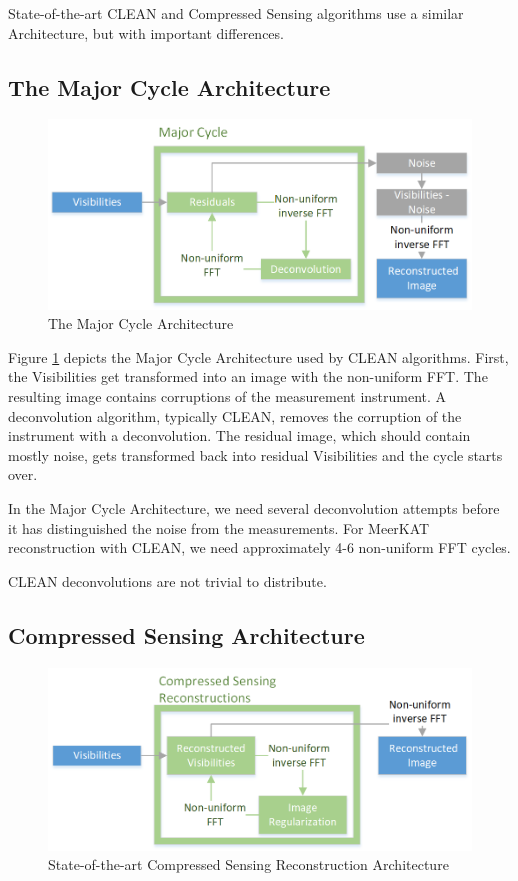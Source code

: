 State-of-the-art CLEAN and Compressed Sensing algorithms use a similar Architecture, but with important differences.


\subsection{The Major Cycle Architecture}

\begin{figure}[h]
	\centering
	\includegraphics[width=0.80\linewidth]{./chapters/02.hypo/Major-Minor.png}
	\caption{The Major Cycle Architecture}
	\label{hypo:major}
\end{figure}


Figure \ref{hypo:major} depicts the Major Cycle Architecture used by CLEAN algorithms. First, the Visibilities get transformed into an image with the non-uniform FFT. The resulting image contains corruptions of the measurement instrument. A deconvolution algorithm, typically CLEAN, removes the corruption of the instrument with a deconvolution. The residual image, which should contain mostly noise, gets transformed back into residual Visibilities and the cycle starts over.

In the Major Cycle Architecture, we need several deconvolution attempts before it has distinguished the noise from the measurements. For MeerKAT reconstruction with CLEAN, we need approximately 4-6 non-uniform FFT cycles. 

CLEAN deconvolutions are not trivial to distribute.


\subsection{Compressed Sensing Architecture}\label{hypo:CSArch}

\begin{figure}[h]
	\centering
	\includegraphics[width=0.80\linewidth]{./chapters/02.hypo/CS.png}
	\caption{State-of-the-art Compressed Sensing Reconstruction Architecture}
	\label{hypo:cs}
\end{figure}

